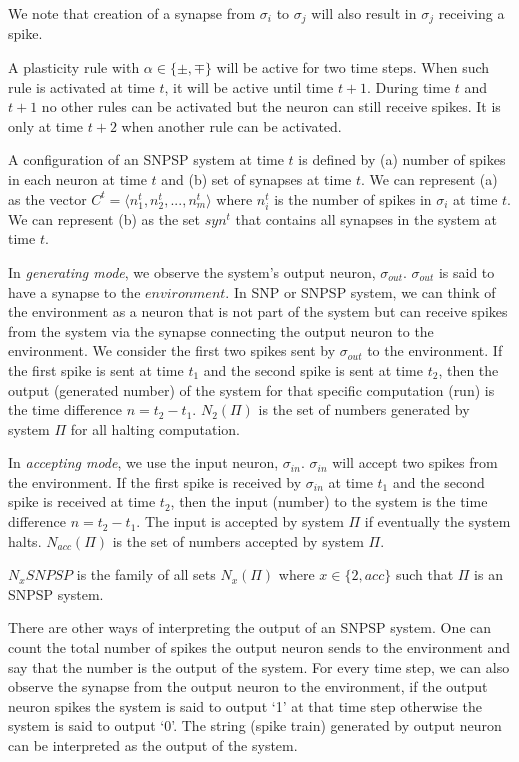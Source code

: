 \documentclass[smallextended]{svjour3}
\begin{document}
We note that creation of a synapse from $\sigma_i$ to $\sigma_j$ will also result in $\sigma_j$ receiving a spike. 
  
A plasticity rule with $\alpha \in \{\pm,\mp\}$ will be active for two time steps. When such rule is activated at time $t$, it will be active until 
time $t+1$. During time $t$ and $t+1$ no other rules can be activated but the neuron can still receive spikes. It is only at time $t+2$ when another
rule can be activated. 

A configuration of an SNPSP system at time $t$ is defined by (a) number of spikes in each neuron at time $t$ and (b) set of synapses at time $t$. 
We can represent (a) as the vector $C^t = \langle n_1^t, n_2^t, ...,n_m^t\rangle$ where $n_i^t$ is the number of spikes in $\sigma_i$ at time $t$.
We can represent (b) as the set $syn^t$ that contains all synapses in the system at time $t$.

In \textit{generating mode}, we observe the system's output neuron, $\sigma_{out}$. $\sigma_{out}$ is said to have a synapse to the $
\textit{environment}$. In SNP or SNPSP system, we can think of the environment as a neuron that is not part of the system but can receive spikes
from the system via the synapse connecting the output neuron to the environment. We consider the first two spikes sent by $\sigma_{out}$ to the environment.
If the first spike is sent at time $t_1$ and the second spike is sent at time $t_2$, then the output (generated number) of the system for that 
specific computation (run) is the time difference $n=t_2-t_1$. $N_2(\Pi)$ is the set of numbers generated by system  $\Pi$ for all halting
computation.

In \textit{accepting mode}, we use the input neuron, $\sigma_{in}$. $\sigma_{in}$ will accept two spikes from the environment. If the first spike is
received by $\sigma_{in}$ at time $t_1$ and the second spike is received at time $t_2$, then the input (number) to the system is the time difference 
$n=t_2-t_1$. The input is accepted by system $\Pi$ if eventually the system halts.  $N_{acc}(\Pi)$ is the set of numbers accepted by system $\Pi$.

$N_xSNPSP$ is the family of all sets $N_x(\Pi)$ where $x \in \{2, acc\}$ such that $\Pi$ is an SNPSP system.

There are other ways of interpreting the output of an SNPSP system. One can count the total number of spikes the output neuron sends to the
environment and say that the number is the output of the system. For every time step, we can also observe the synapse from the output neuron to the
environment, if the output neuron spikes the system is said to output `1' at that time step otherwise the system is said to output `0'. The string
(spike train) generated by output neuron can be interpreted as the output of the system.
\end{document}
